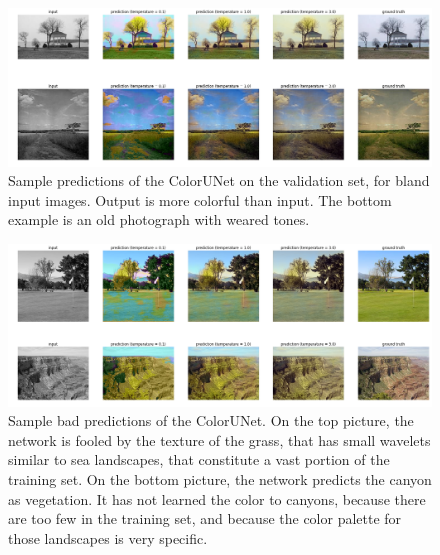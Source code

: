 \documentclass[10pt,twocolumn,letterpaper]{article}
\begin{document}
\begin{figure}
\begin{center}
\includegraphics[width=450px]{better}
\caption{Sample predictions of the ColorUNet on the validation set, for bland input images. Output is more colorful than input. The bottom example is an old photograph with weared tones.}
\label{better}
\end{center}
\end{figure}

\begin{figure}
\begin{center}
\includegraphics[width=450px]{worse}
\caption{Sample bad predictions of the ColorUNet. On the top picture, the network is fooled by the texture of the grass, that has small wavelets similar to sea landscapes, that constitute a vast portion of the training set. On the bottom picture, the network predicts the canyon as vegetation. It has not learned the color to canyons, because there are too few in the training set, and because the color palette for those landscapes is very specific.}
\label{worse}
\end{center}
\end{figure}
\end{document}
